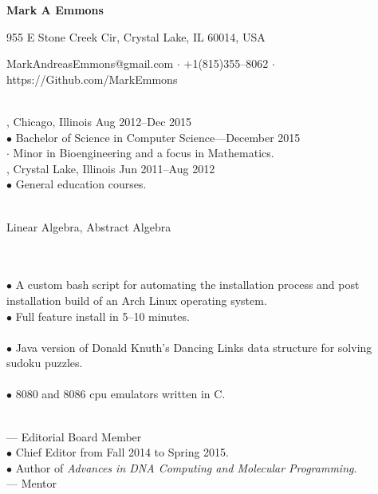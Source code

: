 \documentclass[11pt]{article}
\begin{document}
\centerline{\LARGE \bf Mark A Emmons}
\centerline{955 E Stone Creek Cir, Crystal Lake, IL 60014, USA}
\centerline{MarkAndreasEmmons@gmail.com $\cdot$ +1(815)355--8062 $\cdot$ https://Github.com/MarkEmmons}

 \\
, Chicago, Illinois \hfill Aug 2012--Dec 2015 \\
\indent $\bullet$ Bachelor of Science in Computer Science---December 2015 \\
\indent \indent $\cdot$ Minor in Bioengineering and a focus in Mathematics. \\
, Crystal Lake, Illinois \hfill Jun 2011--Aug 2012 \\
\indent $\bullet$ General education courses.

 \\
\indent Linear Algebra, Abstract Algebra

 \\
 \\
\indent $\bullet$ A custom bash script for automating the installation process and post installation build of an Arch Linux operating system. \\
\indent $\bullet$ Full feature install in 5--10 minutes. \\
 \\
\indent $\bullet$ Java version of Donald Knuth's Dancing Links data structure for solving sudoku puzzles. \\
 \\
\indent $\bullet$ 8080 and 8086 cpu emulators written in C.

 \\
 --- Editorial Board Member \\
\indent $\bullet$ Chief Editor from Fall 2014 to Spring 2015. \\
\indent $\bullet$ Author of \textit{Advances in DNA Computing and Molecular Programming}. \\
 --- Mentor \\
\end{document}
